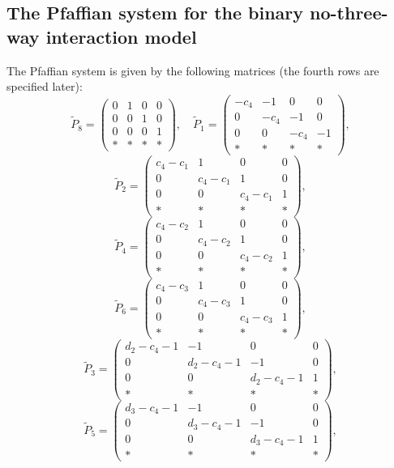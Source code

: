\documentclass[a4paper,12pt]{article}
\theoremstyle{plain}
\theoremstyle{remark}
\begin{document}
\subsection{The Pfaffian system for the binary no-three-way interaction model}

The Pfaffian system is given by the following matrices
(the fourth rows are specified later):
\[
\tilde{P}_8=
\left(
\begin{array}{cccc}
  0&1&0&0\\0&0&1&0\\0&0&0&1\\ *&*&*&*
\end{array}
\right), \quad
\tilde{P}_1=
\left(
\begin{array}{cccc}
  -c_4&-1&0&0\\0&-c_4&-1&0\\0&0&-c_4&-1\\ *&*&*&*
\end{array}
\right),
\]
\[
\tilde{P}_2=
\left(
\begin{array}{cccc}
  c_4-c_1&1&0&0\\0&c_4-c_1&1&0\\0&0&c_4-c_1&1\\ *&*&*&*
\end{array} 
\right),
\]
\[
\tilde{P}_4=
\left(
\begin{array}{cccc}
  c_4-c_2&1&0&0\\0&c_4-c_2&1&0\\0&0&c_4-c_2&1\\ *&*&*&*
\end{array} 
\right),
\]
\[
\tilde{P}_6=
\left(
\begin{array}{cccc}
  c_4-c_3&1&0&0\\0&c_4-c_3&1&0\\0&0&c_4-c_3&1\\ *&*&*&*
\end{array}
\right),
\]
\[
\tilde{P}_3=
\left(
\begin{array}{cccc}
  d_2-c_4-1&-1&0&0\\0&d_2-c_4-1&-1&0\\0&0&d_2-c_4-1&1\\ *&*&*&*
\end{array}
\right),
\]
\[
\tilde{P}_5=
\left(
\begin{array}{cccc}
  d_3-c_4-1&-1&0&0\\0&d_3-c_4-1&-1&0\\0&0&d_3-c_4-1&1\\ *&*&*&*
\end{array}
\right),
\]
\end{document}
